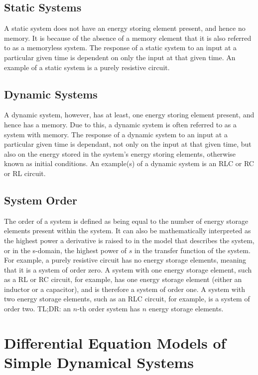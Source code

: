 \documentclass[
  14pt,
  a4paper,
  oneside,
  open=any,
  a4paper,
  14pt]{report}
\begin{document}
\subsection{Static Systems}\label{static-systems}

A static system does not have an energy storing element present, and
hence no memory. It is because of the absence of a memory element that
it is also referred to as a memoryless system. The response of a static
system to an input at a particular given time is dependent on only the
input at that given time. An example of a static system is a purely
resistive circuit.

\subsection{Dynamic Systems}\label{dynamic-systems}

A dynamic system, however, has at least, one energy storing element
present, and hence has a memory. Due to this, a dynamic system is often
referred to as a system with memory. The response of a dynamic system to
an input at a particular given time is dependant, not only on the input
at that given time, but also on the energy stored in the system's energy
storing elements, otherwise known as initial conditions. An example(s)
of a dynamic system is an RLC or RC or RL circuit.

\subsection{System Order}\label{system-order}

The order of a system is defined as being equal to the number of energy
storage elements present within the system. It can also be
mathematically interpreted as the highest power a derivative is raised
to in the model that describes the system, or in the s-domain, the
highest power of \(s\) in the transfer function of the system. For
example, a purely resistive circuit has no energy storage elements,
meaning that it is a system of order zero. A system with one energy
storage element, such as a RL or RC circuit, for example, has one energy
storage element (either an inductor or a capacitor), and is therefore a
system of order one. A system with two energy storage elements, such as
an RLC circuit, for example, is a system of order two. TL;DR: an
\(n\)-th order system has \(n\) energy storage elements.

\section{Differential Equation Models of Simple Dynamical
Systems}\label{differential-equation-models-of-simple-dynamical-systems}
\end{document}
